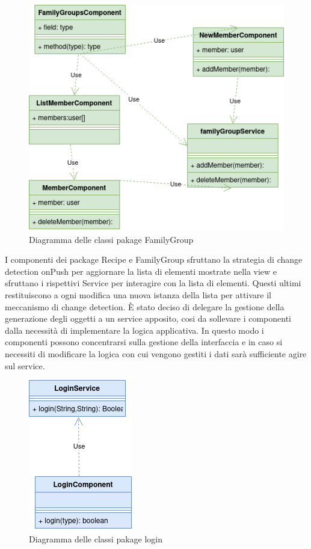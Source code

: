 \begin{figure}[H]
    \centering
 \includegraphics[scale=0.7]{resources/diagramma_package-FamilyGroup.drawio.png}
   \caption{Diagramma delle classi pakage FamilyGroup}
\end{figure}
I componenti dei package Recipe e FamilyGroup sfruttano la strategia di change detection onPush per aggiornare la lista di elementi mostrate nella view e sfruttano i rispettivi Service per interagire con la lista di elementi. Questi ultimi restituiscono a ogni modifica una nuova istanza della lista per attivare il meccanismo  di change detection.
\newline
È stato deciso di delegare la gestione della generazione degli oggetti a un service apposito, cosi da sollevare i componenti dalla necessità di implementare la logica applicativa. In questo modo i componenti possono concentrarsi sulla gestione della interfaccia e in caso si necessiti di modificare la logica con cui vengono gestiti i dati sarà sufficiente agire sul service.
\newpage
\begin{figure}[H]
    \centering
 \includegraphics[scale=0.7]{resources/diagramma_package-login.drawio.png}
   \caption{Diagramma delle classi pakage login}
\end{figure}
